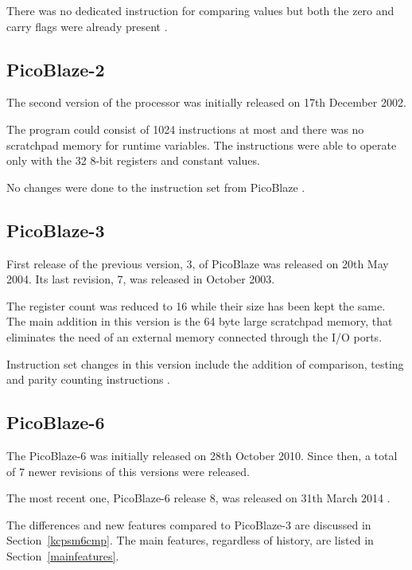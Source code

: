         There was no dedicated instruction for comparing values but both the zero and carry flags were already present \cite{PicoBlaze}.

        \subsection{PicoBlaze-2}

        The second version of the processor was initially released on 17th December 2002.

        The program could consist of 1024 instructions at most and there was no scratchpad memory for runtime variables. The instructions were able to operate only with the 32 8-bit registers and constant values.

        No changes were done to the instruction set from PicoBlaze \cite{PicoBlaze2}.

        \subsection{PicoBlaze-3}

        First release of the previous version, 3, of PicoBlaze was released on 20th May 2004. Its last revision, 7, was released in October 2003.

        The register count was reduced to 16 while their size has been kept the same. The main addition in this version is the 64 byte large scratchpad memory, that eliminates the need of an external memory connected through the I/O ports.

        Instruction set changes in this version include the addition of comparison, testing and parity counting instructions \cite{PicoBlaze3}.

        \subsection{PicoBlaze-6}

        The PicoBlaze-6 was initially released on 28th October 2010. Since then, a total of 7 newer revisions of this versions were released.

        The most recent one, PicoBlaze-6 release 8, was released on 31th March 2014 \cite{PicoBlaze6}.

        The differences and new features compared to PicoBlaze-3 are discussed in Section~\ref{kcpsm6cmp}. The main features, regardless of history, are listed in Section~\ref{mainfeatures}.

